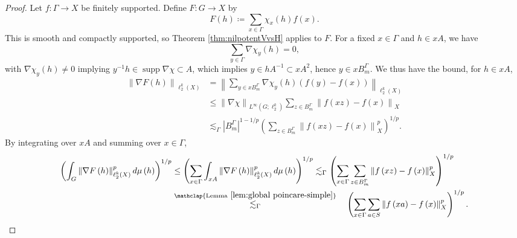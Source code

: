 \documentclass[11pt,reqno]{amsart}
\newcommand{\1}{\mathbf 1}
\begin{document}
\begin{proof}
Let $f:\Gamma\to X$ be finitely supported. Define $F:G\to X$ by
\begin{equation}\label{eq:defF}
F\left(h\right)\coloneqq \sum_{x\in \Gamma} \chi_x\left(h\right)f\left(x\right).
\end{equation}
This is smooth and compactly supported, so Theorem \ref{thm:nilpotentVvsH} applies to $F$.
For a fixed $x\in \Gamma$ and $h\in xA$, we have
\[
\sum_{y\in \Gamma} \nabla\chi_y\left(h\right)=0,
\]
with $\nabla\chi_y\left(h\right)\neq 0$ implying $y^{-1}h\in \operatorname{supp}\nabla\chi\subset A$, which implies $y\in hA^{-1}\subset xA^2$, hence $y\in xB^\Gamma_{m}$. We thus have the bound, for $h\in xA$,
\begin{align*}
\left\|\nabla F\left(h\right)\right\|_{\ell_2^k\left(X\right)}&=\left\|\sum_{y\in xB^\Gamma_{m}}\nabla\chi_y\left(h\right)\left(f\left(y\right)-f\left(x\right)\right)\right\|_{\ell_2^k\left(X\right)}
\\&\le \left\|\nabla\chi\right\|_{L^\infty\left(G;\ell_2^k\right)}\sum_{z\in B^\Gamma_{m}}\left\|f\left(xz\right)-f\left(x\right)\right\|_X\\
&\lesssim_\Gamma \left|B^\Gamma_{m}\right|^{1-1/p}\left(\sum_{z\in B^\Gamma_{m}}\left\|f\left(xz\right)-f\left(x\right)\right\|_X^p\right)^{1/p}.
\end{align*}
By integrating over $xA$ and summing over $x\in \Gamma$,
\begin{align}\label{eq:nablaFbound}
\begin{aligned}
\left(\int_{G} \left\|\nabla F\left(h\right)\right\|_{\ell_2^k\left(X\right)}^pd\mu\left(h\right)\right)^{1/p}&\le \left(\sum_{x\in \Gamma}\int_{xA} \left\|\nabla F\left(h\right)\right\|_{\ell_2^k\left(X\right)}^pd\mu\left(h\right)\right)^{1/p}\lesssim_\Gamma \left(\sum_{x\in \Gamma} \sum_{z\in B^\Gamma_{m}}\left\|f\left(xz\right)-f\left(x\right)\right\|_X^p\right)^{1/p}\\
&\stackrel{\mathclap{\mathrm{Lemma~} \ref{lem:global poincare-simple}}}{\lesssim_\Gamma}\quad \left(\sum_{x\in \Gamma} \sum_{a\in S}\left\|f\left(xa\right)-f\left(x\right)\right\|_X^p\right)^{1/p}.
\end{aligned}
\end{align}



\end{proof}
\end{document}
